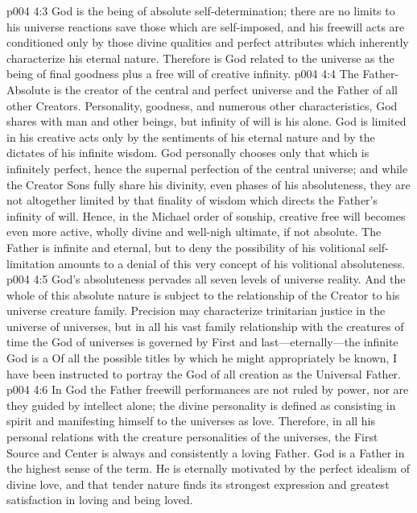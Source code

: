 \vs p004 4:3 God is the being of absolute self\hyp{}determination; there are no limits to his universe reactions save those which are self\hyp{}imposed, and his freewill acts are conditioned only by those divine qualities and perfect attributes which inherently characterize his eternal nature. Therefore is God related to the universe as the being of final goodness plus a free will of creative infinity.
\vs p004 4:4 The Father\hyp{}Absolute is the creator of the central and perfect universe and the Father of all other Creators. Personality, goodness, and numerous other characteristics, God shares with man and other beings, but infinity of will is his alone. God is limited in his creative acts only by the sentiments of his eternal nature and by the dictates of his infinite wisdom. God personally chooses only that which is infinitely perfect, hence the supernal perfection of the central universe; and while the Creator Sons fully share his divinity, even phases of his absoluteness, they are not altogether limited by that finality of wisdom which directs the Father’s infinity of will. Hence, in the Michael order of sonship, creative free will becomes even more active, wholly divine and well\hyp{}nigh ultimate, if not absolute. The Father is infinite and eternal, but to deny the possibility of his volitional self\hyp{}limitation amounts to a denial of this very concept of his volitional absoluteness.
\pc \vs p004 4:5 God’s absoluteness pervades all seven levels of universe reality. And the whole of this absolute nature is subject to the relationship of the Creator to his universe creature family. Precision may characterize trinitarian justice in the universe of universes, but in all his vast family relationship with the creatures of time the God of universes is governed by  First and last---eternally---the infinite God is a  Of all the possible titles by which he might appropriately be known, I have been instructed to portray the God of all creation as the Universal Father.
\vs p004 4:6 In God the Father freewill performances are not ruled by power, nor are they guided by intellect alone; the divine personality is defined as consisting in spirit and manifesting himself to the universes as love. Therefore, in all his personal relations with the creature personalities of the universes, the First Source and Center is always and consistently a loving Father. God is a Father in the highest sense of the term. He is eternally motivated by the perfect idealism of divine love, and that tender nature finds its strongest expression and greatest satisfaction in loving and being loved.
